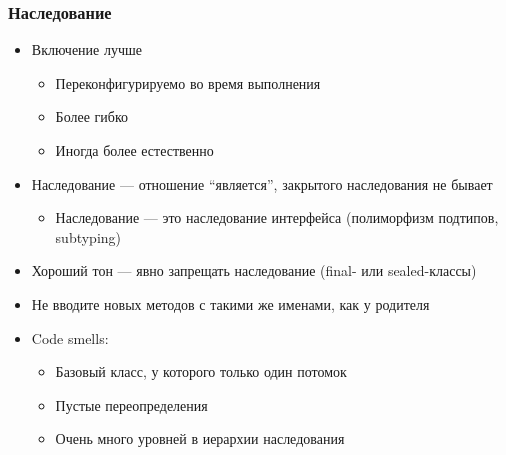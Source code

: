 \documentclass[xetex,mathserif,serif]{beamer}
\begin{document}
	\begin{frame}
		\frametitle{Наследование}
		\begin{itemize}
			\item Включение лучше
			\begin{itemize}
				\item Переконфигурируемо во время выполнения
				\item Более гибко
				\item Иногда более естественно
			\end{itemize}
			\item Наследование --- отношение ``является'', закрытого наследования не бывает
			\begin{itemize}
				\item Наследование --- это наследование интерфейса (полиморфизм подтипов, subtyping)
			\end{itemize}
			\item Хороший тон --- явно запрещать наследование (final- или sealed-классы)
			\item Не вводите новых методов с такими же именами, как у родителя
			\item Code smells:
			\begin{itemize}
				\item Базовый класс, у которого только один потомок
				\item Пустые переопределения
				\item Очень много уровней в иерархии наследования
			\end{itemize}
		\end{itemize}
	\end{frame}
\end{document}
